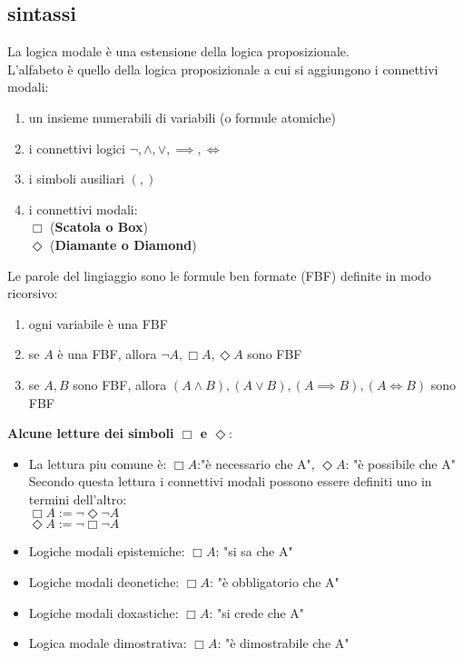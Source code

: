 \documentclass[a4paper,12pt]{article}
\theoremstyle{def}
\theoremstyle{prop}
\theoremstyle{esempio}
\theoremstyle{dimostrazione}
\theoremstyle{teo}
\theoremstyle{osservazione}
\begin{document}
\subsection{sintassi}
La logica modale è una estensione della logica proposizionale.\\
L'alfabeto è quello della logica proposizionale a cui si aggiungono i connettivi modali:
\begin{enumerate}
	\item un insieme numerabili di variabili (o formule atomiche)
	\item i connettivi logici \(\neg, \land, \lor, \implies, \iff\)
	\item i simboli ausiliari \((,)\)
	\item i connettivi modali:\\
			\(\Box\) (\textbf{Scatola o Box})\\
			\(\Diamond\) (\textbf{Diamante o Diamond})
\end{enumerate}
Le parole del lingiaggio sono le formule ben formate (FBF) definite in modo ricorsivo:\\
\begin{enumerate}
	\item ogni variabile è una FBF
	\item se \(A\) è una FBF, allora \(\neg A, \Box A, \Diamond A\) sono FBF
	\item se \(A,B\) sono FBF, allora \((A \land B), (A \lor B), (A \implies B), (A \iff B)\) sono FBF
\end{enumerate}
\textbf{Alcune letture dei simboli \(\Box\) e \(\Diamond\)}:\\
\begin{itemize}
	\item La lettura piu comune è: \(\Box A\):"è necessario che A", \(\Diamond A\): "è possibile che A"\\
			Secondo questa lettura i connettivi modali possono essere definiti uno in termini dell'altro:\\
			\(\Box A := \neg \Diamond \neg A\)\\
			\(\Diamond A := \neg \Box \neg A\)
	\item Logiche modali epistemiche: \(\Box A\): "si sa che A"
	\item Logiche modali deonetiche: \(\Box A\): "è obbligatorio che A"
	\item Logiche modali doxastiche: \(\Box A\): "si crede che A"
	\item Logica modale dimostrativa: \(\Box A\): "è dimostrabile che A"
\end{itemize}
\end{document}
